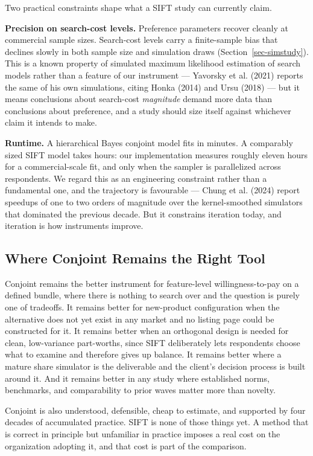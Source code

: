 \documentclass[
  letterpaper,
  DIV=11,
  numbers=noendperiod]{scrartcl}
\newcounter{none} %
\begin{document}
Two practical constraints shape what a SIFT study can currently claim.

\textbf{Precision on search-cost levels.} Preference parameters recover
cleanly at commercial sample sizes. Search-cost levels carry a
finite-sample bias that declines slowly in both sample size and
simulation draws (Section~\ref{sec-simstudy}). This is a known property
of simulated maximum likelihood estimation of search models rather than
a feature of our instrument --- Yavorsky et al. (2021) reports the same
of his own simulations, citing Honka (2014) and Ursu (2018) --- but it
means conclusions about search-cost \emph{magnitude} demand more data
than conclusions about preference, and a study should size itself
against whichever claim it intends to make.

\textbf{Runtime.} A hierarchical Bayes conjoint model fits in minutes. A
comparably sized SIFT model takes hours: our implementation measures
roughly eleven hours for a commercial-scale fit, and only when the
sampler is parallelized across respondents. We regard this as an
engineering constraint rather than a fundamental one, and the trajectory
is favourable --- Chung et al. (2024) report speedups of one to two
orders of magnitude over the kernel-smoothed simulators that dominated
the previous decade. But it constrains iteration today, and iteration is
how instruments improve.

\subsection{Where Conjoint Remains the Right
Tool}\label{sec-disc-conjoint}

Conjoint remains the better instrument for feature-level
willingness-to-pay on a defined bundle, where there is nothing to search
over and the question is purely one of tradeoffs. It remains better for
new-product configuration when the alternative does not yet exist in any
market and no listing page could be constructed for it. It remains
better when an orthogonal design is needed for clean, low-variance
part-worths, since SIFT deliberately lets respondents choose what to
examine and therefore gives up balance. It remains better where a mature
share simulator is the deliverable and the client's decision process is
built around it. And it remains better in any study where established
norms, benchmarks, and comparability to prior waves matter more than
novelty.

Conjoint is also understood, defensible, cheap to estimate, and
supported by four decades of accumulated practice. SIFT is none of those
things yet. A method that is correct in principle but unfamiliar in
practice imposes a real cost on the organization adopting it, and that
cost is part of the comparison.
\end{document}
